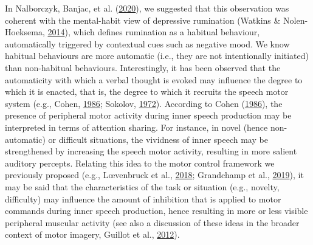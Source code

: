 \documentclass[
  english,
  man, donotrepeattitle,floatsintext]{apa6}
\begin{document}
In Nalborczyk, Banjac, et al. (\protect\hyperlink{ref-nalborczyk_dissociating_2020}{2020}), we suggested that this observation was coherent with the mental-habit view of depressive rumination (Watkins \& Nolen-Hoeksema, \protect\hyperlink{ref-watkins_habit-goal_2014}{2014}), which defines rumination as a habitual behaviour, automatically triggered by contextual cues such as negative mood. We know habitual behaviours are more automatic (i.e., they are not intentionally initiated) than non-habitual behaviours. Interestingly, it has been observed that the automaticity with which a verbal thought is evoked may influence the degree to which it is enacted, that is, the degree to which it recruits the speech motor system (e.g., Cohen, \protect\hyperlink{ref-cohen_motor_1986}{1986}; Sokolov, \protect\hyperlink{ref-sokolov_inner_1972}{1972}). According to Cohen (\protect\hyperlink{ref-cohen_motor_1986}{1986}), the presence of peripheral motor activity during inner speech production may be interpreted in terms of attention sharing. For instance, in novel (hence non-automatic) or difficult situations, the vividness of inner speech may be strengthened by increasing the speech motor activity, resulting in more salient auditory percepts. Relating this idea to the motor control framework we previously proposed (e.g., Lœvenbruck et al., \protect\hyperlink{ref-loevenbruck_cognitive_2018}{2018}; Grandchamp et al., \protect\hyperlink{ref-grandchamp_condialint_2019}{2019}), it may be said that the characteristics of the task or situation (e.g., novelty, difficulty) may influence the amount of inhibition that is applied to motor commands during inner speech production, hence resulting in more or less visible peripheral muscular activity (see also a discussion of these ideas in the broader context of motor imagery, Guillot et al., \protect\hyperlink{ref-guillot_imagining_2012}{2012}).
\end{document}
